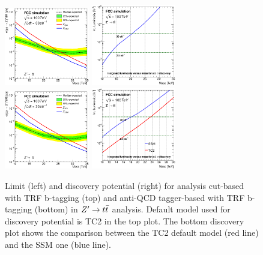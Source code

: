 \documentclass{cernrep}
\begin{document}
\begin{figure}[!htb]\centering
\includegraphics[width=0.33\textwidth]{Fig/Zptt/lim_Zprime_tt_fcc_v02_cut_TRFbtag.eps}
\includegraphics[width=0.33\textwidth]{Fig/Zptt/DiscoveryPotential_tt_cut_TRFbtag_rootStyle.eps}
\includegraphics[width=0.33\textwidth]{Fig/Zptt/lim_Zprime_tt_fcc_v02_tagger_TRFbtag.eps}
\includegraphics[width=0.33\textwidth]{Fig/Zptt/DiscoveryPotential_tt_SSM_TC2_tagger_TRFbtag_rootStyle.eps}
\caption{Limit (left) and discovery potential (right) for analysis cut-based with TRF b-tagging (top) and anti-QCD tagger-based with TRF b-tagging (bottom) in $Z^{\prime} \rightarrow t\bar{t}$ analysis. Default model used for discovery potential is TC2 in the top plot. The bottom discovery plot shows the comparison between the TC2 default model (red line) and the SSM one (blue line).}
\label{fig:Zptt_limit_trf}
\end{figure}
\end{document}
